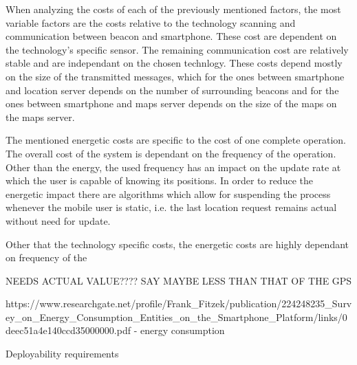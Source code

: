 When analyzing the costs of each of the previously mentioned factors, the most variable factors are the costs relative to the technology scanning and communication between beacon and smartphone. These cost are dependent on the technology's specific sensor. The remaining communication cost are relatively stable and are independant on the chosen technlogy. These costs depend mostly on the size of the transmitted messages, which for the ones between smartphone and location server depends on the number of surrounding beacons and for the ones between smartphone and maps server depends on the size of the maps on the maps server.  

The mentioned energetic costs are specific to the cost of one complete operation. The overall cost of the system is dependant on the frequency of the operation. Other than the energy, the used frequency has an impact on the update rate at which the user is capable of knowing its positions. In order to reduce the energetic impact there are algorithms which allow for suspending the process whenever the mobile user is static, i.e. the last location request remains actual without need for update.

Other that the technology specific costs, the energetic costs are highly dependant on frequency of the 

NEEDS ACTUAL VALUE???? SAY MAYBE LESS THAN THAT OF THE GPS

https://www.researchgate.net/profile/Frank_Fitzek/publication/224248235_Survey_on_Energy_Consumption_Entities_on_the_Smartphone_Platform/links/0deec51a4e140ccd35000000.pdf - energy consumption

Deployability requirements




